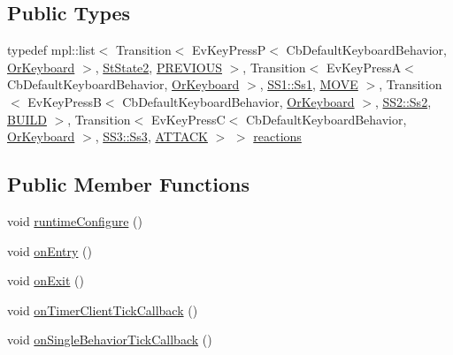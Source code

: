 \subsection*{Public Types}
\begin{DoxyCompactItemize}
\item 
typedef mpl\+::list$<$ Transition$<$ Ev\+Key\+PressP$<$ Cb\+Default\+Keyboard\+Behavior, \hyperlink{classsm__starcraft__ai_1_1OrKeyboard}{Or\+Keyboard} $>$, \hyperlink{structsm__starcraft__ai_1_1StState2}{St\+State2}, \hyperlink{structsm__starcraft__ai_1_1StState3_1_1PREVIOUS}{P\+R\+E\+V\+I\+O\+US} $>$, Transition$<$ Ev\+Key\+PressA$<$ Cb\+Default\+Keyboard\+Behavior, \hyperlink{classsm__starcraft__ai_1_1OrKeyboard}{Or\+Keyboard} $>$, \hyperlink{structsm__starcraft__ai_1_1SS1_1_1Ss1}{S\+S1\+::\+Ss1}, \hyperlink{structsm__starcraft__ai_1_1StState3_1_1MOVE}{M\+O\+VE} $>$, Transition$<$ Ev\+Key\+PressB$<$ Cb\+Default\+Keyboard\+Behavior, \hyperlink{classsm__starcraft__ai_1_1OrKeyboard}{Or\+Keyboard} $>$, \hyperlink{structsm__starcraft__ai_1_1SS2_1_1Ss2}{S\+S2\+::\+Ss2}, \hyperlink{structsm__starcraft__ai_1_1StState3_1_1BUILD}{B\+U\+I\+LD} $>$, Transition$<$ Ev\+Key\+PressC$<$ Cb\+Default\+Keyboard\+Behavior, \hyperlink{classsm__starcraft__ai_1_1OrKeyboard}{Or\+Keyboard} $>$, \hyperlink{structsm__starcraft__ai_1_1SS3_1_1Ss3}{S\+S3\+::\+Ss3}, \hyperlink{structsm__starcraft__ai_1_1StState3_1_1ATTACK}{A\+T\+T\+A\+CK} $>$ $>$ \hyperlink{structsm__starcraft__ai_1_1StState3_a873f77574cc9558f4ec06c2c34040c85}{reactions}
\end{DoxyCompactItemize}
\subsection*{Public Member Functions}
\begin{DoxyCompactItemize}
\item 
void \hyperlink{structsm__starcraft__ai_1_1StState3_a3c4f1f40f6b99dcd25e49db690e33c86}{runtime\+Configure} ()
\item 
void \hyperlink{structsm__starcraft__ai_1_1StState3_a7c22ddc90ea39222f4a487a8139b1e1b}{on\+Entry} ()
\item 
void \hyperlink{structsm__starcraft__ai_1_1StState3_ae9081d8cf159facb484eb81edad6d0b0}{on\+Exit} ()
\item 
void \hyperlink{structsm__starcraft__ai_1_1StState3_a14b229209d9c69ec6583aa29c311cdc2}{on\+Timer\+Client\+Tick\+Callback} ()
\item 
void \hyperlink{structsm__starcraft__ai_1_1StState3_a1cc85a4b2efb5bc647028c10bbe41e66}{on\+Single\+Behavior\+Tick\+Callback} ()
\end{DoxyCompactItemize}
